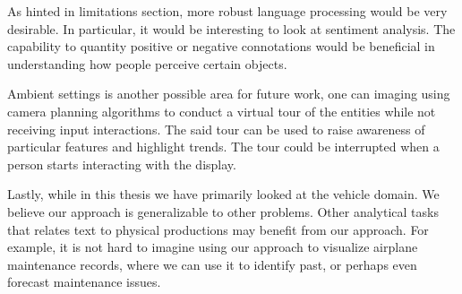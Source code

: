 As hinted in limitations section, more robust language processing would be very
desirable. In particular, it would be interesting to look at sentiment analysis.
The capability to quantity positive or negative connotations would be beneficial
in understanding how people perceive certain objects.

Ambient settings is another possible area for future work, one can imaging using
camera planning algorithms to conduct a virtual tour of the entities while not
receiving input interactions. The said tour can be used to raise awareness of
particular features and highlight trends. The tour could be interrupted when a
person starts interacting with the display.

Lastly, while in this thesis we have primarily looked at the vehicle domain. We
believe our approach is generalizable to other problems. Other analytical tasks
that relates text to physical productions may benefit from our approach. For
example, it is not hard to imagine using our approach to visualize airplane
maintenance records, where we can use it to identify past, or perhaps even
forecast maintenance issues.
